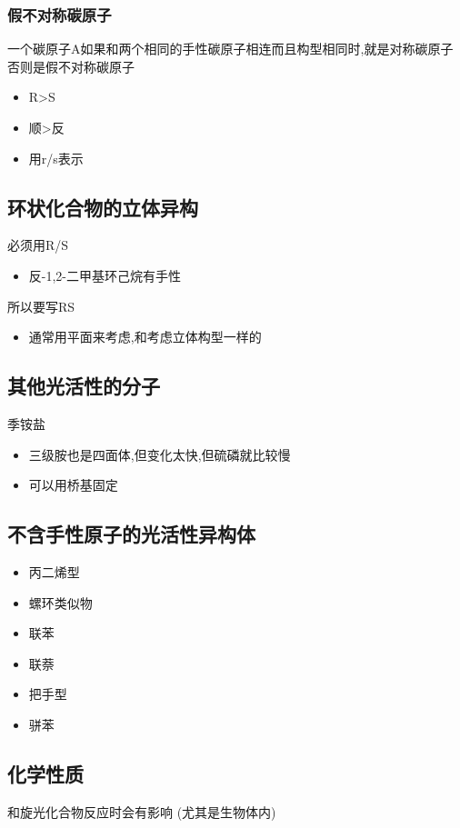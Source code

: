\documentclass[11pt]{article}
\begin{document}
\subsubsection{假不对称碳原子}
\label{sec:orge03e3fa}
一个碳原子A如果和两个相同的手性碳原子相连而且构型相同时,就是对称碳原子
否则是假不对称碳原子
\begin{itemize}
\item R>S
\item 顺>反
\item 用r/s表示
\end{itemize}
\subsection{环状化合物的立体异构}
\label{sec:orgb0ec4ba}
必须用R/S
\begin{itemize}
\item 反-1,2-二甲基环己烷有手性
\end{itemize}
所以要写RS
\begin{itemize}
\item 通常用平面来考虑,和考虑立体构型一样的
\end{itemize}
\subsection{其他光活性的分子}
\label{sec:orgb08a30c}
季铵盐
\begin{itemize}
\item 三级胺也是四面体,但变化太快,但硫磷就比较慢
\item 可以用桥基固定
\end{itemize}
\subsection{不含手性原子的光活性异构体}
\label{sec:orgcce811c}
\begin{itemize}
\item 丙二烯型
\item 螺环类似物
\item 联苯
\item 联萘
\item 把手型
\item 骈苯
\end{itemize}
\subsection{化学性质}
\label{sec:orgcd1de3e}


和旋光化合物反应时会有影响
(尤其是生物体内)
\end{document}
